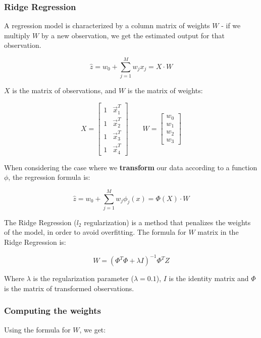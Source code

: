 \documentclass{article}
\begin{document}
\subsubsection*{Ridge Regression}

A regression model is characterized by a column matrix of weights $W$ - if we multiply $W$ by a new observation, we get the estimated output for that observation.

\[ \hat{z} = w_0 + \sum_{j=1}^{M} w_j x_j = X \cdot W \]

$X$ is the matrix of observations, and $W$ is the matrix of weights:

\[ X = \begin{bmatrix} 1 & \vec{x}_1^T \\ 1 & \vec{x}_2^T \\ 1 & \vec{x}_3^T \\ 1 & \vec{x}_4^T \end{bmatrix} \qquad W = \begin{bmatrix} w_0 \\ w_1 \\ w_2 \\ w_3 \end{bmatrix} \]

When considering the case where we \textbf{transform} our data according to a function $\phi$, the regression formula is:

\[ \hat{z} = w_0 + \sum_{j=1}^{M} w_j \phi_j(x) = \Phi(X) \cdot W \]

The Ridge Regression ($l_2$ regularization) is a method that penalizes the weights of the model, in order to avoid overfitting. The formula for $W$ matrix in the Ridge Regression is:

\[ W = ( \Phi^T \Phi + \lambda I )^{-1} \Phi^T Z \]

Where $\lambda$ is the regularization parameter ($\lambda = 0.1$), $I$ is the identity matrix and $\Phi$ is the matrix of transformed observations.

\subsubsection*{Computing the weights}

Using the formula for $W$, we get:
\end{document}

